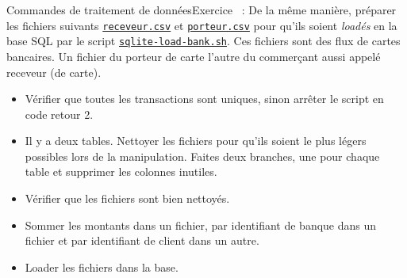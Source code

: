 \documentclass{beamer}
\begin{document}
    \begin{frame}{Commandes de traitement de données}{Exercice \execcounterdispinc{}~:}
        De la même manière, préparer les fichiers suivants \href{https://github.com/DigicompClassesByPapIT/linux2/blob/main/receveur.csv}{\lstinline{receveur.csv}} et \href{https://github.com/DigicompClassesByPapIT/linux2/blob/main/porteur.csv}{\lstinline{porteur.csv}} pour qu'ils soient \textit{loadés} en la base SQL par le script \href{https://github.com/DigicompClassesByPapIT/linux2/blob/main/sqlite-load-bank.sh}{\lstinline{sqlite-load-bank.sh}}.
        \bigbreak
        Ces fichiers sont des flux de cartes bancaires.
        Un fichier du porteur de carte l'autre du commerçant aussi appelé receveur (de carte).
        \begin{itemize}
            \item Vérifier que toutes les transactions sont uniques, sinon arrêter le script en code retour 2.
            \item Il y a deux tables.
            Nettoyer les fichiers pour qu'ils soient le plus légers possibles lors de la manipulation.
            Faites deux branches, une pour chaque table et supprimer les colonnes inutiles.
            \item Vérifier que les fichiers sont bien nettoyés.
            \item Sommer les montants dans un fichier, par identifiant de banque dans un fichier et par identifiant de client dans un autre.
            \item Loader les fichiers dans la base.
        \end{itemize}
    \end{frame}
\end{document}
